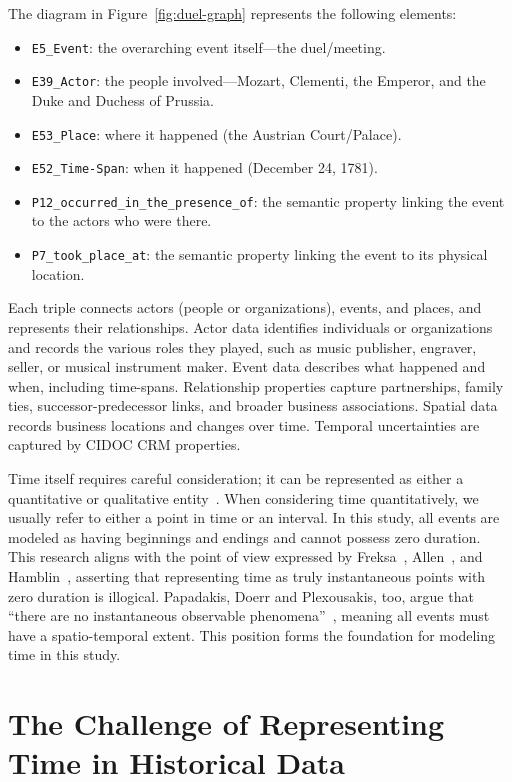 \documentclass[final]{anthology-ch} %
\begin{document}
The diagram in Figure~\ref{fig:duel-graph} represents the following elements:
\begin{itemize}
  \item \texttt{E5\_Event}: the overarching event itself---the duel/meeting.
  \item \texttt{E39\_Actor}: the people involved---Mozart, Clementi, the Emperor, and the Duke and Duchess of Prussia.
  \item \texttt{E53\_Place}: where it happened (the Austrian Court/Palace).
  \item \texttt{E52\_Time-Span}: when it happened (December 24, 1781).
  \item \texttt{P12\_occurred\_in\_the\_presence\_of}: the semantic property linking the event to the actors who were there.
  \item \texttt{P7\_took\_place\_at}: the semantic property linking the event to its physical location.
\end{itemize}

Each triple connects actors (people or organizations), events, and places, and represents their relationships. Actor data identifies individuals or organizations and records the various roles they played, such as music publisher, engraver, seller, or musical instrument maker. Event data describes what happened and when, including time-spans. Relationship properties capture partnerships, family ties, successor-predecessor links, and broader business associations. Spatial data records business locations and changes over time. Temporal uncertainties are captured by CIDOC CRM properties.

Time itself requires careful consideration; it can be represented as either a quantitative or qualitative entity~\cite[3]{batsakis2009temporal}. When considering time quantitatively, we usually refer to either a point in time or an interval. In this study, all events are modeled as having beginnings and endings and cannot possess zero duration. This research aligns with the point of view expressed by Freksa~\cite{freksa1992temporal}, Allen~\cite{allen1983maintaining}, and Hamblin~\cite{hamblin1972instants}, asserting that representing time as truly instantaneous points with zero duration is illogical. Papadakis, Doerr and Plexousakis, too, argue that \enquote{there are no instantaneous observable phenomena}~\cite[4]{papadakis2014fuzzy}, meaning all events must have a spatio-temporal extent. This position forms the foundation for modeling time in this study.

\section{The Challenge of Representing Time in Historical Data} \label{sec:challenge}
\end{document}
